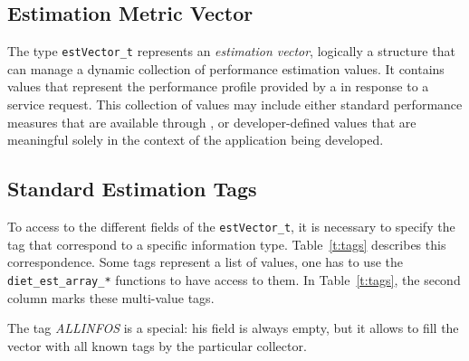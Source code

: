 
\subsection{Estimation Metric Vector}\label{sect:estvector}

The type \texttt{estVector\_t} represents an \emph{estimation vector},
logically a structure that can manage a dynamic collection of performance
estimation values. It contains values that represent the performance profile
provided by a {\sed} in response to a \diet service request. This collection of
values may include either standard performance measures that are available
through \diet, or developer-defined values that are meaningful solely in the
context of the application being developed.

\subsection{Standard Estimation Tags}\label{sect:estTags}

To access to the different fields of the \texttt{estVector\_t}, it is necessary
to specify the tag that correspond to a specific information type.
Table~\ref{t:tags} describes this correspondence. Some tags represent a list of
values, one has to use the \texttt{diet\_est\_array\_*} functions to have
access to them. In Table~\ref{t:tags},  the second column marks these
multi-value tags.

The tag \textit{ALLINFOS} is a special: his field is always empty, but it
allows to fill the vector with all known tags  by the particular collector.
 
